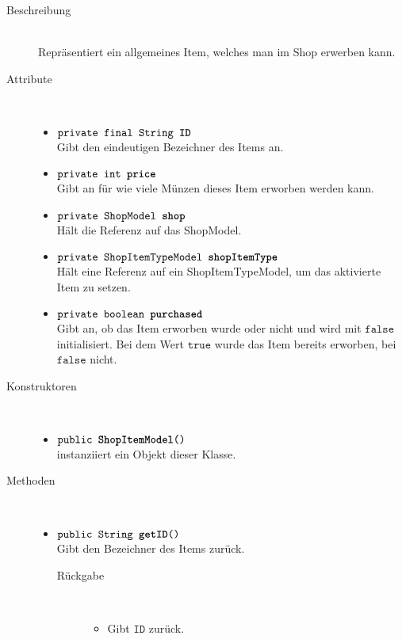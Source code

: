 \begin{description}
\item[Beschreibung] \hfill \\ Repräsentiert ein allgemeines Item, welches man im Shop erwerben kann.

\item[Attribute] \hfill \\
	\vspace{-.8cm}
	\begin{itemize}
		\item $\texttt{private final String \textbf{ID}}$ \\ Gibt den eindeutigen Bezeichner des Items an.
		\item $\texttt{private int \textbf{price}}$ \\ Gibt an für wie viele Münzen dieses Item erworben werden kann.
		\item $\texttt{private ShopModel \textbf{shop}}$ \\ Hält die Referenz auf das ShopModel.
		\item $\texttt{private ShopItemTypeModel \textbf{shopItemType}}$ \\ 	Hält eine Referenz auf ein ShopItemTypeModel, um das aktivierte Item zu setzen.
		\item $\texttt{private boolean \textbf{purchased}}$ \\ Gibt an, ob das Item erworben wurde oder nicht und wird mit $\texttt{false}$ initialisiert. Bei dem Wert $\texttt{true}$ wurde das Item bereits erworben, bei $\texttt{false}$ nicht.
		\end{itemize}
	
\item[Konstruktoren] \hfill \\
	\vspace{-.8cm}
	\begin{itemize}
		\item $\texttt{public \textbf{ShopItemModel}()}$ \\ instanziiert ein Objekt dieser Klasse.

	\end{itemize}
	
\item[Methoden] \hfill \\
	\vspace{-.8cm}
	\begin{itemize}
		\item $\texttt{public String \textbf{getID}()}$ \\ Gibt den Bezeichner des Items zurück.
		\begin{description}
			\item[Rückgabe] \hfill \\
			\vspace{-.8cm}
			\begin{itemize}
				\item Gibt $\texttt{ID}$ zurück.
			\end{itemize}
			\end{description}
		

\end{itemize}
\end{description}
